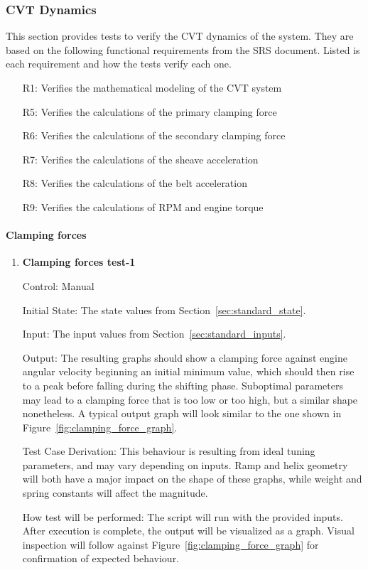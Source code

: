 \documentclass[12pt, titlepage]{article}
\begin{document}
\subsubsection{CVT Dynamics}

This section provides tests to verify the CVT dynamics of the system.
They are based on the following functional requirements from the SRS document.
Listed is each requirement and how the tests verify each one.
\begin{itemize}
  \item [R1:] Verifies the mathematical modeling of the CVT system
  \item [R5:] Verifies the calculations of the primary clamping force
  \item [R6:] Verifies the calculations of the secondary clamping force
  \item [R7:] Verifies the calculations of the sheave acceleration
  \item [R8:] Verifies the calculations of the belt acceleration
  \item [R9:] Verifies the calculations of RPM and engine torque
\end{itemize}

\paragraph{Clamping forces}

\begin{enumerate}

  \item {} \hypertarget{Clamping forces test-1}{\textbf{Clamping forces test-1}} \label{Clamping forces test-1}
  
  Control: Manual
            
  Initial State: The state values from Section~\ref{sec:standard_state}.
  
  Input: The input values from Section~\ref{sec:standard_inputs}.
            
  Output: The resulting graphs should show a clamping force against engine angular velocity beginning an initial minimum value, which should then rise to a peak before falling during the shifting phase. Suboptimal parameters may lead to a clamping force that is too low or too high, but a similar shape nonetheless. A typical output graph will look similar to the one shown in Figure~\ref{fig:clamping_force_graph}.
  
  Test Case Derivation: This behaviour is resulting from ideal tuning parameters, and may vary depending on inputs. Ramp and helix geometry will both have a major impact on the shape of these graphs, while weight and spring constants will affect the magnitude.
  
  How test will be performed: The script will run with the provided inputs. After execution is complete, the output will be visualized as a graph. Visual inspection will follow against Figure~\ref{fig:clamping_force_graph} for confirmation of expected behaviour.
  
\end{enumerate}
\end{document}
